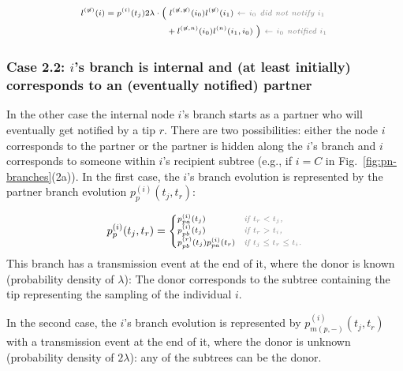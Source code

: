 \documentclass[10pt,letterpaper]{article}
\begin{document}
\begin{equation}
\scriptsize
\begin{split}
l^{(\not{n})}(i) = p^{(i)}(t_j) 2\lambda \cdot 
\Big(&~l^{(\not{n},\not{n})}(i_0)l^{(\not{n})}(i_1) \textit{\color{gray}~$\leftarrow$ $i_0$ did not notify $i_1$ } \\
&+ l^{(\not{n},n)}(i_0)l^{(n)}(i_1,i_0)~\Big) \textit{\color{gray}~$\leftarrow$ $i_0$ notified $i_1$} \\
\end{split}\label{eq:lu-int-tip}
\end{equation}

\subsubsection*{Case 2.2: $i$'s branch is internal and (at least initially) corresponds to an (eventually notified) partner} 

In the other case the internal node $i$'s branch starts as a partner who will eventually get notified by a tip $r$.
There are two possibilities: either the node $i$ corresponds to the partner or the partner is hidden along the $i$'s branch and $i$ corresponds to someone within $i$'s recipient subtree (e.g., if $i=C$ in Fig.~\ref{fig:pn-branches}(2a)). In the first case, the $i$'s branch evolution is represented by the partner branch evolution $p_{p}^{(i)}(t_j, t_r)$:

\begin{equation}
\scriptsize
p_{p}^{(i)}(t_j, t_r) =
\begin{cases}
p_{pa}^{(i)}(t_j) &\textit{\color{gray} if $t_r < t_j$,}\\
p_{pb}^{(i)}(t_j) &\textit{\color{gray} if $t_r > t_i$,}\\
p_{pb}^{(r)}(t_j)p_{pa}^{(i)}(t_r) &\textit{\color{gray} if $t_j \leq t_r \leq t_i$.}\\
\end{cases}\label{eq:p-p}
\end{equation}
This branch has a transmission event at the end of it, where the donor is known (probability density of $\lambda$): The donor corresponds to the subtree containing the tip representing the sampling of the individual $i$.

In the second case, the $i$'s branch evolution is represented by $p_{m(p,-)}^{(i)}(t_j,t_r)$ with a transmission event at the end of it, where the donor is unknown (probability density of $2\lambda$): any of the subtrees can be the donor.
 
\end{document}
